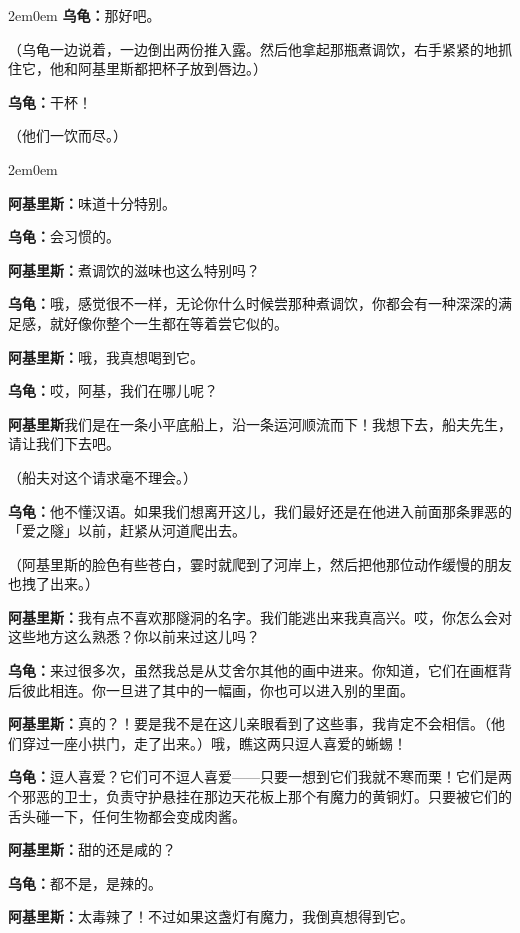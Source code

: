 \documentclass[
  12pt,
  twoside,
  openright,
  oldfontcommands,
]{memoir}
\newcommand{\kaitismall}[1]{{\kaitifamily\small #1}}
\newcommand{\dialogname}[1]{{\heifamily\bfseries #1}}
\begin{document}
\begin{adjustwidth}{2em}{0em}
\dialogname{乌龟：}那好吧。

（乌龟一边说着，一边倒出两份推入露。然后他拿起那瓶煮调饮，右手紧紧的地抓住它，他和阿基里斯都把杯子放到唇边。）

\dialogname{乌龟：}干杯！

（他们一饮而尽。）

\begin{adjustwidth}{2em}{0em}

\dialogname{阿基里斯：}味道十分特别。

\dialogname{乌龟：}会习惯的。

\dialogname{阿基里斯：}煮调饮的滋味也这么特别吗？

\dialogname{乌龟：}哦，感觉很不一样，无论你什么时候尝那种煮调饮，你都会有一种深深的满足感，就好像你整个一生都在等着尝它似的。

\dialogname{阿基里斯：}哦，我真想喝到它。

\dialogname{乌龟：}哎，阿基，我们在哪儿呢？

\dialogname{阿基里斯}我们是在一条小平底船上，沿一条运河顺流而下！我想下去，船夫先生，请让我们下去吧。

（船夫对这个请求毫不理会。）

\dialogname{乌龟：}他不懂汉语。如果我们想离开这儿，我们最好还是在他进入前面那条罪恶的「爱之隧」以前，赶紧从河道爬出去。

（阿基里斯的脸色有些苍白，霎时就爬到了河岸上，然后把他那位动作缓慢的朋友也拽了出来。）

\dialogname{阿基里斯：}我有点不喜欢那隧洞的名字。我们能逃出来我真高兴。哎，你怎么会对这些地方这么熟悉？你以前来过这儿吗？

\dialogname{乌龟：}来过很多次，虽然我总是从艾舍尔其他的画中进来。你知道，它们在画框背后彼此相连。你一旦进了其中的一幅画，你也可以进入别的里面。

\dialogname{阿基里斯：}真的？！要是我不是在这儿亲眼看到了这些事，我肯定不会相信。\kaitismall{（他们穿过一座小拱门，走了出来。）}哦，瞧这两只逗人喜爱的蜥蜴！

\dialogname{乌龟：}逗人喜爱？它们可不逗人喜爱------只要一想到它们我就不寒而栗！它们是两个邪恶的卫士，负责守护悬挂在那边天花板上那个有魔力的黄铜灯。只要被它们的舌头碰一下，任何生物都会变成肉酱。

\dialogname{阿基里斯：}甜的还是咸的？

\dialogname{乌龟：}都不是，是辣的。

\dialogname{阿基里斯：}太毒辣了！不过如果这盏灯有魔力，我倒真想得到它。

\end{adjustwidth}

\end{adjustwidth}
\end{document}
